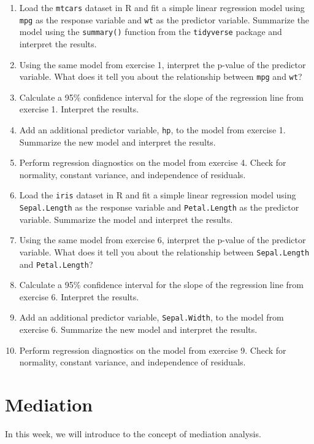 \documentclass[
]{book}
\begin{document}
\begin{enumerate}
\def\labelenumi{\arabic{enumi}.}
\item
  Load the \texttt{mtcars} dataset in R and fit a simple linear regression model using \texttt{mpg} as the response variable and \texttt{wt} as the predictor variable. Summarize the model using the \texttt{summary()} function from the \texttt{tidyverse} package and interpret the results.
\item
  Using the same model from exercise 1, interpret the p-value of the predictor variable. What does it tell you about the relationship between \texttt{mpg} and \texttt{wt}?
\item
  Calculate a 95\% confidence interval for the slope of the regression line from exercise 1. Interpret the results.
\item
  Add an additional predictor variable, \texttt{hp}, to the model from exercise 1. Summarize the new model and interpret the results.
\item
  Perform regression diagnostics on the model from exercise 4. Check for normality, constant variance, and independence of residuals.
\item
  Load the \texttt{iris} dataset in R and fit a simple linear regression model using \texttt{Sepal.Length} as the response variable and \texttt{Petal.Length} as the predictor variable. Summarize the model and interpret the results.
\item
  Using the same model from exercise 6, interpret the p-value of the predictor variable. What does it tell you about the relationship between \texttt{Sepal.Length} and \texttt{Petal.Length}?
\item
  Calculate a 95\% confidence interval for the slope of the regression line from exercise 6. Interpret the results.
\item
  Add an additional predictor variable, \texttt{Sepal.Width}, to the model from exercise 6. Summarize the new model and interpret the results.
\item
  Perform regression diagnostics on the model from exercise 9. Check for normality, constant variance, and independence of residuals.
\end{enumerate}

\hypertarget{med}{%
\chapter{Mediation}\label{med}}

In this week, we will introduce to the concept of mediation analysis.
\end{document}
